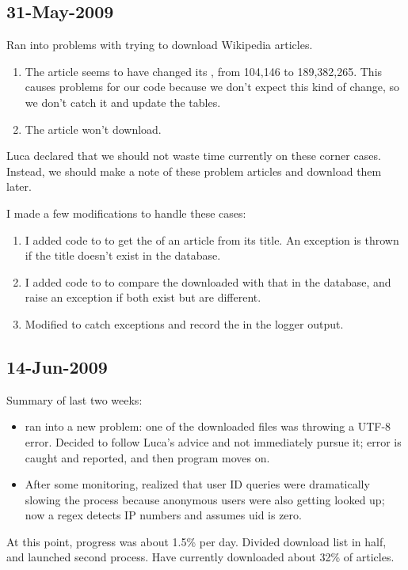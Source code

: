 \subsection{31-May-2009}

Ran into problems with trying to download Wikipedia articles.
\begin{enumerate}
\item The article  seems to have changed
	its , from 104,146 to 189,382,265.
	This causes problems for our code because we don't expect
	this kind of change, so we don't catch it and update the tables.
\item The article  won't download.
\end{enumerate}

Luca declared that we should not waste time currently on these corner cases.
Instead, we should make a note of these problem articles
and download them later.

I made a few modifications to handle these cases:
\begin{enumerate}
\item I added code to  to get the 
	of an article from its title.  An exception is thrown if the
	title doesn't exist in the database.
\item I added code to  to compare the
	 downloaded with that in the database,
	and raise an exception if both exist but are different.
\item Modified  to catch exceptions and record
	the  in the logger output.
\end{enumerate}

\subsection{14-Jun-2009}

Summary of last two weeks:
\begin{itemize}
\item ran into a new problem: one of the downloaded
files was throwing a UTF-8 error.
Decided to follow Luca's advice and not immediately pursue it;
error is caught and reported, and then program moves on.
\item After some monitoring, realized that user ID queries were dramatically
slowing the process because anonymous users were also getting looked up;
now a regex detects IP numbers and assumes uid is zero.
\end{itemize}
At this point, progress was about 1.5\% per day.
Divided download list in half, and launched second process.
Have currently downloaded about 32\% of articles.

